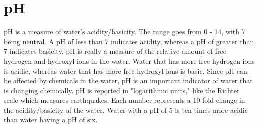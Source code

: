 \documentclass[a4paper]{article}
\begin{document}
\begin{minipage}[t]{0.45\textwidth}
\section*{\small pH}
{\normalsize pH is a measure of water's acidity/basicity. The range goes from 0 - 14, with 7 being neutral. A pH of less than 7 indicates acidity, whereas a pH of greater than 7 indicates basicity. pH is really a measure of the relative amount of free hydrogen and hydroxyl ions in the water. Water that has more free hydrogen ions is acidic, whereas water that has more free hydroxyl ions is basic. Since pH can be affected by chemicals in the water, pH is an important indicator of water that is changing chemically. pH is reported in "logarithmic units," like the Richter scale which measures earthquakes. Each number represents a 10-fold change in the acidity/basicity of the water. Water with a pH of 5 is ten times more acidic than water having a pH of six. }
\end{minipage} 
\hspace{.5cm}
\end{document}
